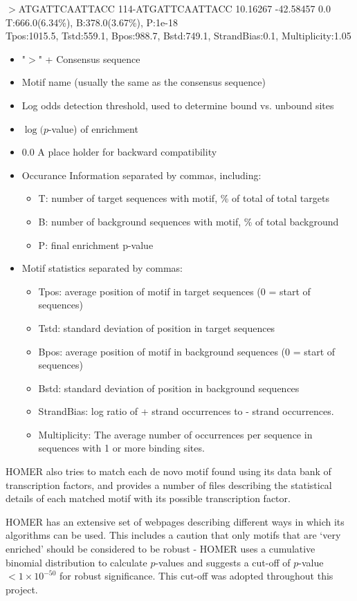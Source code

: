 \documentclass[12pt]{article}
\begin{document}
$>$ATGATTCAATTACC	114-ATGATTCAATTACC	
10.16267	-42.58457	0.0\\	T:666.0(6.34\%), B:378.0(3.67\%), P:1e-18\\ Tpos:1015.5, Tstd:559.1, Bpos:988.7, Bstd:749.1, StrandBias:0.1, Multiplicity:1.05
\begin{itemize}
\item"$>$" + Consensus sequence 
\item Motif name (usually the same as the consensus sequence)
\item Log odds detection threshold, used to determine bound vs. unbound sites 
\item $\log(p$-value) of enrichment
\item 0.0  A place holder for backward compatibility
\item Occurance Information separated by commas, including:
\begin{itemize}
\item T: number of target sequences with motif, \% of total of total targets
\item B: number of background sequences with motif, \% of total background
\item P: final enrichment p-value
\end{itemize}
\item Motif statistics separated by commas: 
\begin{itemize}
\item Tpos: average position of motif in target sequences (0 = start of sequences)
\item Tstd: standard deviation of position in target sequences
\item Bpos: average position of motif in background sequences (0 = start of sequences)
\item Bstd: standard deviation of position in background sequences
\item StrandBias: log ratio of + strand occurrences to - strand occurrences.
\item Multiplicity: The average number of occurrences per sequence in sequences with 1 or more binding sites.
\end{itemize}
\end{itemize}

HOMER also tries to match each de novo motif found using its data bank of transcription factors, and provides a number of files describing the statistical details of each matched motif with its possible transcription factor.

HOMER has an extensive set of webpages describing different ways in which its algorithms can be used. This includes a caution that only motifs that are `very enriched' should be considered to be robust - HOMER uses a cumulative binomial distribution to calculate $p$-values and suggests a cut-off of $p$-value $ <1\times10^{-50}$ for robust significance. This cut-off was adopted throughout this project. 
\end{document}
